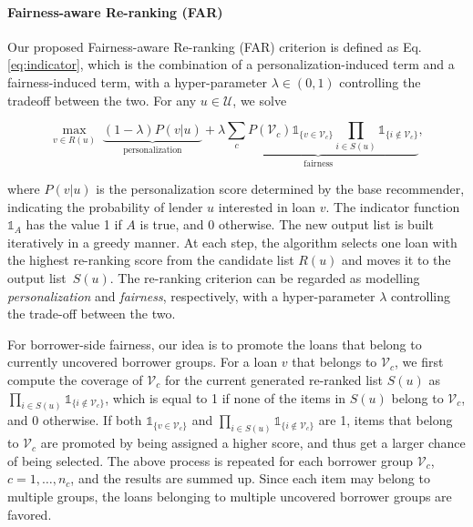 \paragraph{\textbf{Fairness-aware Re-ranking (FAR)}}

Our proposed Fairness-aware Re-ranking (FAR) criterion is defined as Eq.\eqref{eq:indicator}, which is the combination of a personalization-induced term and a fairness-induced term, with a hyper-parameter $\lambda\in(0,1)$ controlling the tradeoff between the two. For any $u\in \mathcal U$, we solve

\begin{equation}
\max_{v\in R(u)}\;\underbrace{(1-\lambda)P(v|u)}_{\text{personalization}} + \underbrace{\lambda\sum_{c}P(\mathcal V_c)\mathds{1}_{\{v\in \mathcal V_c\}}\prod_{i\in S(u)}\mathds{1}_{\{i\notin \mathcal V_c\}}}_{\text{fairness}},%
\label{eq:indicator}
\end{equation}
\vspace{0.25cm}

where $P(v|u)$ is the personalization score determined by the base recommender, indicating the probability of lender $u$ interested in loan $v$. The indicator function $\mathds{1}_{A}$ has the value 1 if $A$ is true, and 0 otherwise. The new output list is built iteratively in a greedy manner. At each step, the algorithm selects one loan with the highest re-ranking score from the candidate list $R(u)$ and moves it to the output list~$S(u)$. The re-ranking criterion can be regarded as modelling \textit{personalization} and \textit{fairness}, respectively, with a hyper-parameter $\lambda$ controlling the trade-off between the two.

For borrower-side fairness, our idea is to promote the loans that belong to currently uncovered borrower groups. For a loan $v$ that belongs to $\mathcal V_c$, we first compute the coverage of $\mathcal V_c$ for the current generated re-ranked list $S(u)$ as $\prod_{i\in S(u)}\mathds{1}_{\{i\notin \mathcal V_c\}}$, which is equal to 1 if none of the items in $S(u)$ belong to $\mathcal V_c$, and 0 otherwise. If both $\mathds{1}_{\{v\in \mathcal V_c\}}$ and $\prod_{i\in S(u)}\mathds{1}_{\{i\notin \mathcal V_c\}}$ are 1, items that belong to $\mathcal V_c$ are promoted by being assigned a higher score, and thus get a larger chance of being selected. The above process is repeated for each borrower group $\mathcal V_c$, $c={1,\ldots,n_c}$, and the results are summed up. Since each item may belong to multiple groups, the loans belonging to multiple uncovered borrower groups are favored. 

